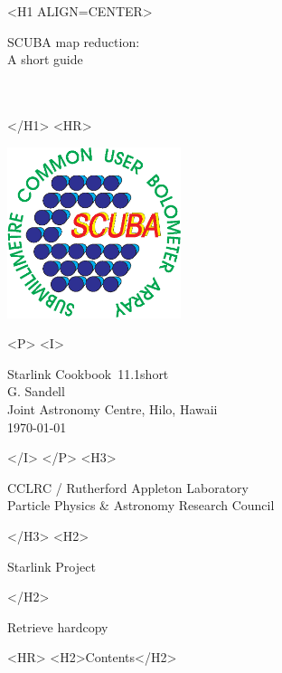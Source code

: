\documentclass[twoside,11pt]{article}
\newcommand{\stardoccategory}  {Starlink Cookbook}
\newcommand{\stardocsource}    {sc\stardocnumber}
\newcommand{\stardocnumber}    {11.1short}
\newcommand{\stardocauthors}   {G. Sandell \\ \jac}
\newcommand{\stardocdate}      {\today}
\newcommand{\stardoctitle}     {SCUBA map reduction:\\[2ex]
                                A short guide}
\newcommand{\stardocversion}   {\ }
\newcommand{\stardocmanual}    {\ }
\newcommand{\jac}{\htmladdnormallink{Joint Astronomy Centre}{http://www.jach.hawaii.edu},
 Hilo, Hawaii}
\newcommand{\htmladdnormallink}[2]{#1}
\newcommand{\htmladdimg}[1]{}
\newcommand{\htmlref}[2]{#1}
\newcommand{\htmladdtonavigation}[1]{}
\newcommand{\xlabel}[1]{}
\renewcommand{\_}{\texttt{\symbol{95}}}
\begin{document}
\begin{htmlonly}
   \xlabel{}
   \begin{rawhtml} <H1 ALIGN=CENTER> \end{rawhtml}
      \stardoctitle\\
      \stardocversion\\
      \stardocmanual
   \begin{rawhtml} </H1> <HR> \end{rawhtml}

\includegraphics[width=2.0in]{sc11_logo.eps}

   \begin{rawhtml} <P> <I> \end{rawhtml}
   \stardoccategory\ \stardocnumber \\
   \stardocauthors \\
   \stardocdate
   \begin{rawhtml} </I> </P> <H3> \end{rawhtml}
      \htmladdnormallink{CCLRC}{http://www.cclrc.ac.uk} /
      \htmladdnormallink{Rutherford Appleton Laboratory}
                        {http://www.cclrc.ac.uk/ral} \\
      \htmladdnormallink{Particle Physics \& Astronomy Research Council}
                        {http://www.pparc.ac.uk} \\
   \begin{rawhtml} </H3> <H2> \end{rawhtml}
      \htmladdnormallink{Starlink Project}{http://star-www.rl.ac.uk/}
   \begin{rawhtml} </H2> \end{rawhtml}
   \htmladdnormallink{\htmladdimg{source.gif} Retrieve hardcopy}
      {http://star-www.rl.ac.uk/cgi-bin/hcserver?\stardocsource}\\

  \label{stardoccontents}
  \begin{rawhtml} 
    <HR>
    <H2>Contents</H2>
  \end{rawhtml}
  \htmladdtonavigation{\htmlref{\htmladdimg{contents_motif.gif}}
        {stardoccontents}}


\end{htmlonly}
\end{document}

